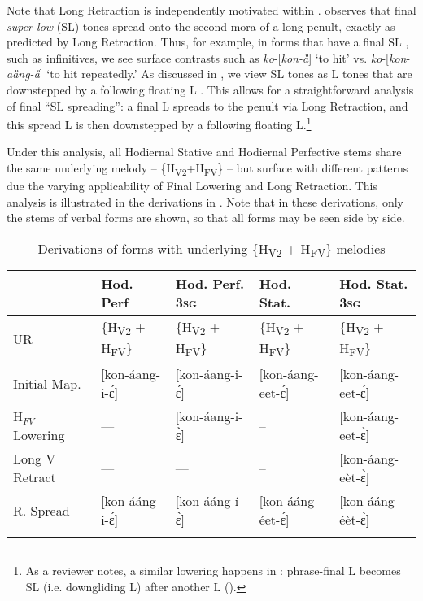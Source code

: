 \documentclass[output=paper,newtxmath,modfonts,nonflat,hidelinks]{langsci/langscibook}
\begin{document}
Note that Long Retraction is independently motivated within . \citet{Roberts-Kohno2014} observes that final \textit{super-low} (SL) tones spread onto the second mora of a long penult, exactly as predicted by Long Retraction. Thus, for example, in forms that have a final SL , such as infinitives, we see surface contrasts such as \textit{ko}-[\textit{kon-ȁ}] ‘to hit’ vs. \textit{ko}-[\textit{kon}-\textit{aȁng-ȁ}] ‘to hit repeatedly.’ As discussed in , we view SL tones as L tones that are downstepped by a following floating L \citep[cf.][]{Clements1981}. This allows for a straightforward analysis of final “SL spreading”: a final L spreads to the penult via Long Retraction, and this spread L is then downstepped by a following floating L.\footnote{As a reviewer notes, a similar lowering happens in : phrase-final L becomes SL (i.e. downgliding L) after another L (\citealt[10]{Mwita2008,Marlo2014}).}

Under this analysis, all Hodiernal Stative and Hodiernal Perfective stems share the same underlying melody – \{H\textsubscript{V2}+H\textsubscript{FV}\} – but surface with different  patterns due the varying applicability of Final Lowering and Long Retraction. This analysis is illustrated in the derivations in . Note that in these derivations, only the stems of verbal forms are shown, so that all forms may be seen side by side.
 

\begin{table}
\footnotesize
\begin{tabularx}{\textwidth}{l@{~}QQQQ} 
\lsptoprule
 & {Hod. Perf} & {Hod. Perf. 3}\textsc{sg} & {Hod. Stat.} & {Hod. Stat. 3}\textsc{sg}\\
\midrule
UR & \{H\textsubscript{V2} + H\textsubscript{FV}\} & 
	  \{H\textsubscript{V2} + H\textsubscript{FV}\} & 
	      \{H\textsubscript{V2} + H\textsubscript{FV}\} & 
		  \{H\textsubscript{V2} + H\textsubscript{FV}\} \\
{Initial} Map. & [kon-áang-i-\'ɛ] & [kon-áang-i-\'ɛ] & [kon-áang-eet-\'ɛ] & [kon-áang-eet-\'ɛ]\\
H$_{FV}$ Lowering & --- & [kon-áang-i-\`ɛ] & -- & [kon-áang-eet-\`ɛ]\\
{Long V Retract} & --- & --- & -- & [kon-áang-eèt-\`ɛ]\\
{R. Spread} & [kon-ááng-i-\'ɛ] & [kon-ááng-í-\`ɛ] & [kon-ááng-éet-\'ɛ] & [kon-ááng-éèt-\`ɛ]\\
\lspbottomrule
\end{tabularx}
\caption{Derivations of forms with underlying \{H\textsubscript{V2} + H\textsubscript{FV}\} melodies}
\label{tab:jones:5}
\end{table}
 
\end{document}
